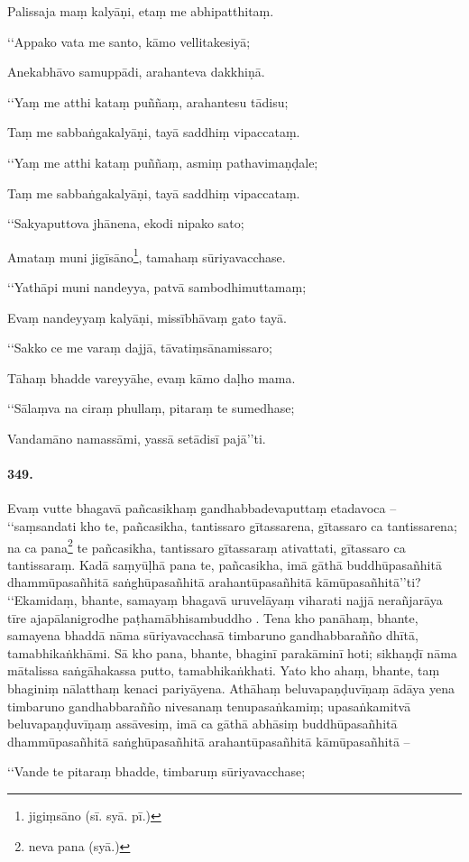 Palissaja maṃ kalyāṇi, etaṃ me abhipatthitaṃ.

‘‘Appako vata me santo, kāmo vellitakesiyā;

Anekabhāvo samuppādi, arahanteva dakkhiṇā.

‘‘Yaṃ me atthi kataṃ puññaṃ, arahantesu tādisu;

Taṃ me sabbaṅgakalyāṇi, tayā saddhiṃ vipaccataṃ.

‘‘Yaṃ me atthi kataṃ puññaṃ, asmiṃ pathavimaṇḍale;

Taṃ me sabbaṅgakalyāṇi, tayā saddhiṃ vipaccataṃ.

‘‘Sakyaputtova jhānena, ekodi nipako sato;

Amataṃ muni jigīsāno\footnote{jigiṃsāno (sī. syā. pī.)}, tamahaṃ sūriyavacchase.

‘‘Yathāpi muni nandeyya, patvā sambodhimuttamaṃ;

Evaṃ nandeyyaṃ kalyāṇi, missībhāvaṃ gato tayā.

‘‘Sakko ce me varaṃ dajjā, tāvatiṃsānamissaro;

Tāhaṃ bhadde vareyyāhe, evaṃ kāmo daḷho mama.

‘‘Sālaṃva na ciraṃ phullaṃ, pitaraṃ te sumedhase;

Vandamāno namassāmi, yassā setādisī pajā’’ti.

\paragraph{349.} Evaṃ vutte bhagavā pañcasikhaṃ gandhabbadevaputtaṃ etadavoca – ‘‘saṃsandati kho te, pañcasikha, tantissaro gītassarena, gītassaro ca tantissarena; na ca pana\footnote{neva pana (syā.)} te pañcasikha, tantissaro gītassaraṃ ativattati, gītassaro ca tantissaraṃ. Kadā saṃyūḷhā pana te, pañcasikha, imā gāthā buddhūpasañhitā dhammūpasañhitā saṅghūpasañhitā arahantūpasañhitā kāmūpasañhitā’’ti? ‘‘Ekamidaṃ, bhante, samayaṃ bhagavā uruvelāyaṃ viharati najjā nerañjarāya tīre ajapālanigrodhe paṭhamābhisambuddho . Tena kho panāhaṃ, bhante, samayena bhaddā nāma sūriyavacchasā timbaruno gandhabbarañño dhītā, tamabhikaṅkhāmi. Sā kho pana, bhante, bhaginī parakāminī hoti; sikhaṇḍī nāma mātalissa saṅgāhakassa putto, tamabhikaṅkhati. Yato kho ahaṃ, bhante, taṃ bhaginiṃ nālatthaṃ kenaci pariyāyena. Athāhaṃ beluvapaṇḍuvīṇaṃ ādāya yena timbaruno gandhabbarañño nivesanaṃ tenupasaṅkamiṃ; upasaṅkamitvā beluvapaṇḍuvīṇaṃ assāvesiṃ, imā ca gāthā abhāsiṃ buddhūpasañhitā dhammūpasañhitā saṅghūpasañhitā arahantūpasañhitā kāmūpasañhitā –

‘‘Vande te pitaraṃ bhadde, timbaruṃ sūriyavacchase;

